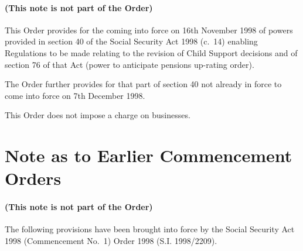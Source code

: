 \documentclass[12pt,a4paper]{article}
\begin{document}
\renewcommand\parthead{--- Explanatory Note}

\subsection*{(This note is not part of the Order)}

This Order provides for the coming into force on 16th November 1998 of powers provided in section 40 of the Social Security Act 1998 (c.\ 14) enabling Regulations to be made relating to the revision of Child Support decisions and of section 76 of that Act (power to anticipate pensions up-rating order).

  The Order further provides for that part of section 40 not already in force to come into force on 7th December 1998.

  This Order does not impose a charge on businesses.

\part{Note as to Earlier Commencement Orders}

\renewcommand\parthead{--- Note as to Earlier Commencement Orders}

\subsection*{(This note is not part of the Order)}

 The following provisions have been brought into force by the Social Security Act 1998 (Commencement No.\ 1) Order 1998 (S.I. 1998/2209).
\end{document}
